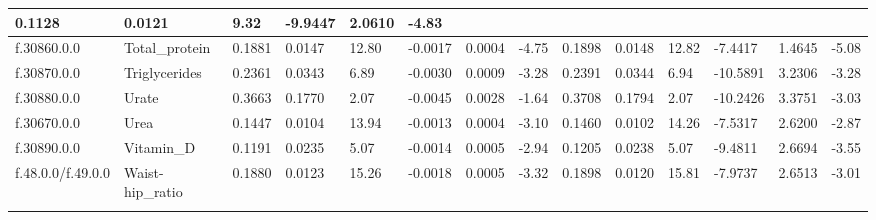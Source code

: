 \begin{longtable}{llllllllllllll}
  \multicolumn{1}{l|}{0.1128} &
  \multicolumn{1}{l|}{0.0121} &
  \multicolumn{1}{l|}{9.32} &
  \multicolumn{1}{l|}{-9.9447} &
  \multicolumn{1}{l|}{2.0610} &
  \multicolumn{1}{l|}{-4.83} \\ \hline
\multicolumn{1}{|l|}{f.30860.0.0} &
  \multicolumn{1}{l|}{Total\_protein} &
  \multicolumn{1}{l|}{0.1881} &
  \multicolumn{1}{l|}{0.0147} &
  \multicolumn{1}{l|}{12.80} &
  \multicolumn{1}{l|}{-0.0017} &
  \multicolumn{1}{l|}{0.0004} &
  \multicolumn{1}{l|}{-4.75} &
  \multicolumn{1}{l|}{0.1898} &
  \multicolumn{1}{l|}{0.0148} &
  \multicolumn{1}{l|}{12.82} &
  \multicolumn{1}{l|}{-7.4417} &
  \multicolumn{1}{l|}{1.4645} &
  \multicolumn{1}{l|}{-5.08} \\ \hline
\multicolumn{1}{|l|}{f.30870.0.0} &
  \multicolumn{1}{l|}{Triglycerides} &
  \multicolumn{1}{l|}{0.2361} &
  \multicolumn{1}{l|}{0.0343} &
  \multicolumn{1}{l|}{6.89} &
  \multicolumn{1}{l|}{-0.0030} &
  \multicolumn{1}{l|}{0.0009} &
  \multicolumn{1}{l|}{-3.28} &
  \multicolumn{1}{l|}{0.2391} &
  \multicolumn{1}{l|}{0.0344} &
  \multicolumn{1}{l|}{6.94} &
  \multicolumn{1}{l|}{-10.5891} &
  \multicolumn{1}{l|}{3.2306} &
  \multicolumn{1}{l|}{-3.28} \\ \hline
\multicolumn{1}{|l|}{f.30880.0.0} &
  \multicolumn{1}{l|}{Urate} &
  \multicolumn{1}{l|}{0.3663} &
  \multicolumn{1}{l|}{0.1770} &
  \multicolumn{1}{l|}{2.07} &
  \multicolumn{1}{l|}{-0.0045} &
  \multicolumn{1}{l|}{0.0028} &
  \multicolumn{1}{l|}{-1.64} &
  \multicolumn{1}{l|}{0.3708} &
  \multicolumn{1}{l|}{0.1794} &
  \multicolumn{1}{l|}{2.07} &
  \multicolumn{1}{l|}{-10.2426} &
  \multicolumn{1}{l|}{3.3751} &
  \multicolumn{1}{l|}{-3.03} \\ \hline
\multicolumn{1}{|l|}{f.30670.0.0} &
  \multicolumn{1}{l|}{Urea} &
  \multicolumn{1}{l|}{0.1447} &
  \multicolumn{1}{l|}{0.0104} &
  \multicolumn{1}{l|}{13.94} &
  \multicolumn{1}{l|}{-0.0013} &
  \multicolumn{1}{l|}{0.0004} &
  \multicolumn{1}{l|}{-3.10} &
  \multicolumn{1}{l|}{0.1460} &
  \multicolumn{1}{l|}{0.0102} &
  \multicolumn{1}{l|}{14.26} &
  \multicolumn{1}{l|}{-7.5317} &
  \multicolumn{1}{l|}{2.6200} &
  \multicolumn{1}{l|}{-2.87} \\ \hline
\multicolumn{1}{|l|}{f.30890.0.0} &
  \multicolumn{1}{l|}{Vitamin\_D} &
  \multicolumn{1}{l|}{0.1191} &
  \multicolumn{1}{l|}{0.0235} &
  \multicolumn{1}{l|}{5.07} &
  \multicolumn{1}{l|}{-0.0014} &
  \multicolumn{1}{l|}{0.0005} &
  \multicolumn{1}{l|}{-2.94} &
  \multicolumn{1}{l|}{0.1205} &
  \multicolumn{1}{l|}{0.0238} &
  \multicolumn{1}{l|}{5.07} &
  \multicolumn{1}{l|}{-9.4811} &
  \multicolumn{1}{l|}{2.6694} &
  \multicolumn{1}{l|}{-3.55} \\ \hline
f.48.0.0/f.49.0.0 &
  Waist-hip\_ratio &
  0.1880 &
  0.0123 &
  15.26 &
  -0.0018 &
  0.0005 &
  -3.32 &
  0.1898 &
  0.0120 &
  15.81 &
  -7.9737 &
  2.6513 &
  -3.01 \\ \hline
  \label{table:4.1}
\end{longtable}